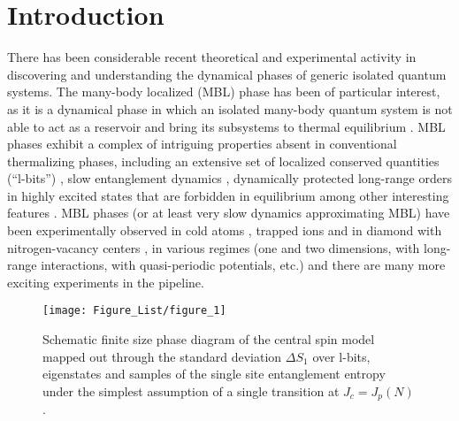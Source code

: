 \documentclass[aps,pra,twocolumn,a4paper,showpacs,superscriptaddress,floatfix,10pt]{revtex4}
\begin{document}
\section{Introduction}
\label{sec:introduction}

There has been considerable recent theoretical and experimental activity in discovering and understanding the dynamical phases of generic isolated quantum systems.
The many-body localized (MBL) phase has been of particular interest, as it is a dynamical phase in which an isolated many-body quantum system is not able to act as a reservoir and bring its subsystems to thermal equilibrium \cite{Anderson:1958ly,Gornyi:2005lq,Basko:2006aa,Oganesyan:2007aa,Pal:2010gs,Nandkishore:2015aa,Altman:2015aa}.
MBL phases exhibit a complex of intriguing properties absent in conventional thermalizing phases, including an extensive set of localized conserved quantities (``l-bits'') \cite{Serbyn:2013rt,Huse:2014ac,Imbrie2016,Ros:2015rw,chandran2015constructing,Monthus:2016aa,Rademaker:2016aa}, slow entanglement dynamics \cite{Znidaric:2008aa,Bardarson:2012kl,Bauer:2013rz,Serbyn:2013uq}, dynamically protected long-range orders in highly excited states that are forbidden in equilibrium \cite{Huse:2013aa,Pekker:2014aa,Chandran:2014aa,Kjall:2014aa, Bahri:2015aa} among other interesting features \cite{Bar-Lev:2015aa,Devakul:2015aa,Torres-Herrera:2015aa,Gopalakrishnan:2016aa,Luitz:2016aa,Znidaric:2016aa,Altland:2017aa}.
MBL phases (or at least very slow dynamics approximating MBL) have been experimentally observed in cold atoms \cite{Kondov:2015aa,Schreiber:2015aa,Choi:2016aa,Bordia:2017aa}, trapped ions \cite{Smith:2016aa} and in diamond with nitrogen-vacancy centers \cite{Kucsko:2016aa}, in various regimes (one and two dimensions, with long-range interactions, with quasi-periodic potentials, etc.) and there are many more exciting experiments in the pipeline.

\begin{figure}[htbp]
\texttt{[image: Figure\_List/figure\_1]}
\caption{
\label{fig:phase_diagram}
Schematic finite size phase diagram of the central spin model mapped out through the standard deviation $\Delta S_1$ over l-bits, eigenstates and samples of the single site entanglement entropy under the simplest assumption of a single transition at $J_c = J_p(N)$.
}
\end{figure}
\end{document}
